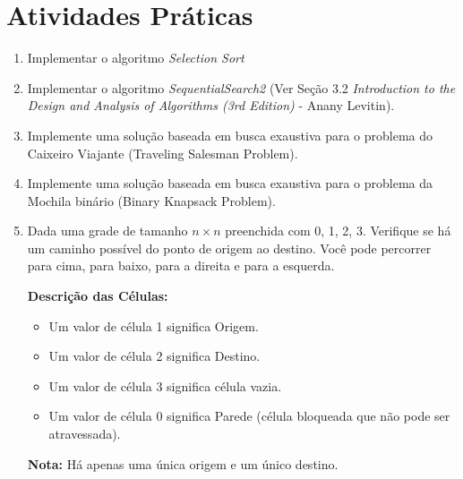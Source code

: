 \documentclass{article}
\begin{document}
\section{Atividades Práticas}

\begin{enumerate}
    \item Implementar o algoritmo \textit{Selection Sort}
    \item Implementar o algoritmo \textit{SequentialSearch2} (Ver Seção 3.2  \textit{Introduction to the Design and Analysis of Algorithms (3rd Edition)} - Anany Levitin).
    \item Implemente uma solução baseada em busca exaustiva para o problema do Caixeiro Viajante (Traveling Salesman Problem). 
    \item Implemente uma solução baseada em busca exaustiva para o problema da Mochila binário (Binary Knapsack Problem).
    \item Dada uma grade de tamanho \( n \times n \) preenchida com 0, 1, 2, 3. Verifique se há um caminho possível do ponto de origem ao destino. Você pode percorrer para cima, para baixo, para a direita e para a esquerda. 

    \textbf{Descrição das Células:}
    \begin{itemize}
        \item Um valor de célula 1 significa Origem.
        \item Um valor de célula 2 significa Destino.
        \item Um valor de célula 3 significa célula vazia.
        \item Um valor de célula 0 significa Parede (célula bloqueada que não pode ser atravessada).
    \end{itemize}
    
    \textbf{Nota:} Há apenas uma única origem e um único destino.
    

\end{enumerate}
\end{document}
